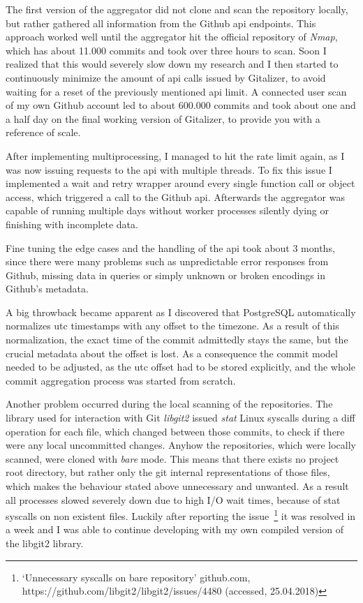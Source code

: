 The first version of the aggregator did not clone and scan the repository locally, but rather gathered all information from the Github \ac{api} endpoints.
This approach worked well until the aggregator hit the official repository of \emph{Nmap}, which has about 11.000 commits and took over three hours to scan.
Soon I realized that this would severely slow down my research and I then started to continuously minimize the amount of \ac{api} calls issued by Gitalizer, to avoid waiting for a reset of the previously mentioned \ac{api} limit.
A connected user scan of my own Github account led to about 600.000 commits and took about one and a half day on the final working version of Gitalizer, to provide you with a reference of scale.

After implementing multiprocessing, I managed to hit the rate limit again, as I was now issuing requests to the \ac{api} with multiple threads.
To fix this issue I implemented a wait and retry wrapper around every single function call or object access, which triggered a call to the Github \ac{api}.
Afterwards the aggregator was capable of running multiple days without worker processes silently dying or finishing with incomplete data.

Fine tuning the edge cases and the handling of the \ac{api} took about 3 months, since there were many problems such as unpredictable error responses from Github, missing data in queries or simply unknown or broken encodings in Github's metadata.

A big throwback became apparent as I discovered that PostgreSQL automatically normalizes \ac{utc} timestamps with any offset to the  timezone.
As a result of this normalization, the exact time of the commit admittedly stays the same, but the crucial metadata about the offset is lost.
As a consequence the commit model needed to be adjusted, as the \ac{utc} offset had to be stored explicitly, and the whole commit aggregation process was started from scratch.

Another problem occurred during the local scanning of the repositories.
The library used for interaction with Git \emph{libgit2} issued \emph{stat} Linux syscalls during a diff operation for each file, which changed between those commits, to check if there were any local uncommitted changes.
Anyhow the repositories, which were locally scanned, were cloned with \emph{bare} mode.
This means that there exists no project root directory, but rather only the git internal representations of those files, which makes the behaviour stated above unnecessary and unwanted.
As a result all processes slowed severely down due to high I/O wait times, because of stat syscalls on non existent files.
Luckily after reporting the issue~\footnote{`Unnecessary syscalls on bare repository' github.com, https://github.com/libgit2/libgit2/issues/4480 (accessed, 25.04.2018)} it was resolved in a week and I was able to continue developing with my own compiled version of the libgit2 library.
